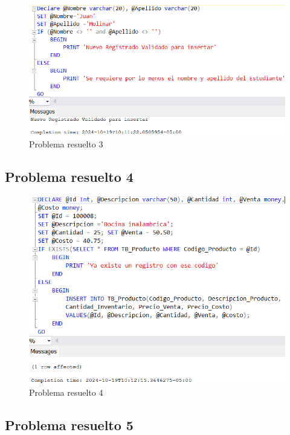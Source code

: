 \begin{figure}[H]
  \centering
  \includegraphics[scale = 0.5]{Imagenes/probs_resueltos/pr3.png}
  \caption{Problema resuelto 3}
\end{figure}

\subsection{Problema resuelto 4}

\begin{figure}[H]
  \centering
  \includegraphics[scale = 0.5]{Imagenes/probs_resueltos/pr4.png}
  \caption{Problema resuelto 4}
\end{figure}

\subsection{Problema resuelto 5}

